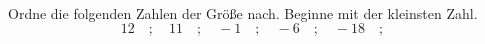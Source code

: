 \begin{aufgabe} ~ \\ 
Ordne die folgenden Zahlen der Größe nach. Beginne mit der kleinsten Zahl.\[12\quad ; \quad11\quad ; \quad-1\quad ; \quad-6\quad ; \quad-18\quad ; \quad\]\underline{\hspace{12cm}}\end{aufgabe} 

